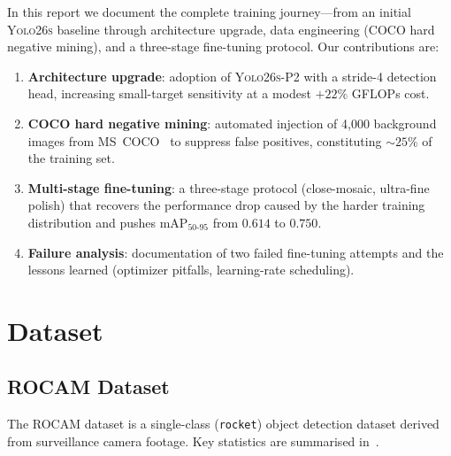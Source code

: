 \documentclass[11pt, a4paper]{article}
\newcommand{\mapfull}{\text{mAP}_{50\text{-}95}}
\newcommand{\yolobase}{\textsc{Yolo26s}}
\newcommand{\yolop}{\textsc{Yolo26s-P2}}
\begin{document}
In this report we document the complete training journey---from an initial
\yolobase{} baseline through architecture upgrade, data engineering (COCO hard
negative mining), and a three-stage fine-tuning protocol. Our contributions
are:

\begin{enumerate}[leftmargin=*]
  \item \textbf{Architecture upgrade}: adoption of \yolop{} with a
        stride-4 detection head, increasing small-target sensitivity
        at a modest $+22\%$ GFLOPs cost.
  \item \textbf{COCO hard negative mining}: automated injection of
        4{,}000 background images from MS~COCO~\cite{lin2014coco} to
        suppress false positives, constituting $\sim\!25\%$ of the
        training set.
  \item \textbf{Multi-stage fine-tuning}: a three-stage protocol
        (close-mosaic, ultra-fine polish) that recovers the
        performance drop caused by the harder training distribution
        and pushes $\mapfull$ from $0.614$ to $0.750$.
  \item \textbf{Failure analysis}: documentation of two failed
        fine-tuning attempts and the lessons learned (optimizer
        pitfalls, learning-rate scheduling).
\end{enumerate}

\section{Dataset}
\label{sec:dataset}

\subsection{ROCAM Dataset}

The ROCAM dataset is a single-class (\texttt{rocket}) object detection dataset
derived from surveillance camera footage. Key statistics are summarised
in~.
\end{document}

